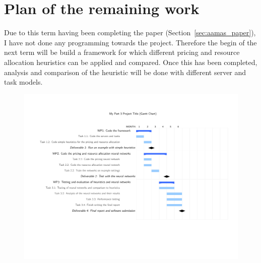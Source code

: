 \documentclass[sotoncolour]{uosproject}     %
\begin{document}
\section{Plan of the remaining work}
Due to this term having been completing the paper (Section~\ref{sec:aamas_paper}), I have not done any programming
towards the project. Therefore the begin of the next term will be build a framework for which different pricing and
resource allocation heuristics can be applied and compared. Once this has been completed, analysis and comparison of
the heuristic will be done with different server and task models.
\begin{figure}
    \centering
    \includegraphics[width=\linewidth]{future_work_grantt/future_grantt}
    \caption{}
    \label{fig:future_grantt}
\end{figure}

\backmatter

\appendix
\section*{}\label{sec:aamas_paper} %











\end{document}
